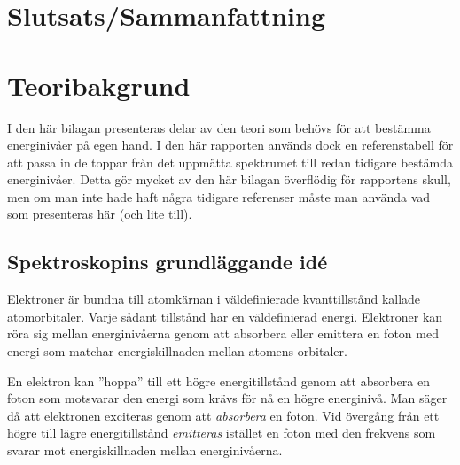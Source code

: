 \documentclass[11pt,a4paper]{article}
\begin{document}
\section{Slutsats/Sammanfattning}





\newpage
{}




\clearpage
\appendix
\setcounter{page}{1}
\renewcommand*{\thepage}{A\arabic{page}}




\section{Teoribakgrund}
I den här bilagan presenteras delar av den teori som behövs för att
bestämma energinivåer på egen hand. I den här rapporten används dock
en referenstabell för att passa in de toppar från det uppmätta
spektrumet till redan tidigare bestämda energinivåer. Detta gör mycket
av den här bilagan överflödig för rapportens skull, men om man inte
hade haft några tidigare referenser måste man använda vad som
presenteras här (och lite till).

\subsection{Spektroskopins grundläggande idé}
Elektroner är bundna till atomkärnan i väldefinierade kvanttillstånd
kallade atomorbitaler. Varje sådant tillstånd har en väldefinierad
energi. Elektroner kan röra sig mellan energinivåerna genom att
absorbera eller emittera en foton med energi som matchar 
energiskillnaden mellan atomens orbitaler. 

En elektron kan ''hoppa'' till ett högre energitillstånd genom att
absorbera en foton som motsvarar den energi som krävs för nå en högre
energinivå. Man säger då att elektronen exciteras genom att
\emph{absorbera} en foton. Vid övergång från ett högre till lägre
energitillstånd \emph{emitteras} istället en foton med den frekvens
som svarar mot energiskillnaden mellan energinivåerna. 
 
\end{document}
